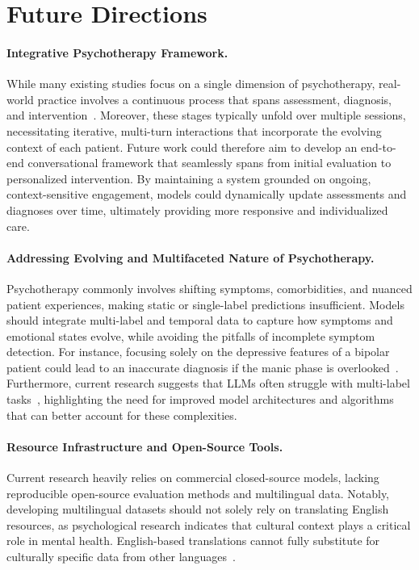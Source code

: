 \section{Future Directions}
\label{sec:future}
\paragraph{Integrative Psychotherapy Framework.} While many existing studies focus on a single dimension of psychotherapy, real-world practice involves a continuous process that spans assessment, diagnosis, and intervention~\cite{Section2:5}. Moreover, these stages typically unfold over multiple sessions, necessitating iterative, multi-turn interactions that incorporate the evolving context of each patient. Future work could therefore aim to develop an end-to-end conversational framework that seamlessly spans from initial evaluation to personalized intervention. By maintaining a system grounded on ongoing, context-sensitive engagement, models could dynamically update assessments and diagnoses over time, ultimately providing more responsive and individualized care.

\paragraph{Addressing Evolving and Multifaceted Nature of Psychotherapy.} Psychotherapy commonly involves shifting symptoms, comorbidities, and nuanced patient experiences, making static or single-label predictions insufficient. Models should integrate multi-label and temporal data to capture how symptoms and emotional states evolve, while avoiding the pitfalls of incomplete symptom detection. For instance, focusing solely on the depressive features of a bipolar patient could lead to an inaccurate diagnosis if the manic phase is overlooked~\cite{lee-etal-2024-detecting-bipolar}. Furthermore, current research suggests that LLMs often struggle with multi-label tasks~\cite{22,96}, highlighting the need for improved model architectures and algorithms that can better account for these complexities.

\paragraph{Resource Infrastructure and Open-Source Tools.} Current research heavily relies on commercial closed-source models, lacking reproducible open-source evaluation methods and multilingual data. Notably, developing multilingual datasets should not solely rely on translating English resources, as psychological research indicates that cultural context plays a critical role in mental health. English-based translations cannot fully substitute for culturally specific data from other languages~\cite{watters2010crazy, abdelkadir-etal-2024-diverse}.

